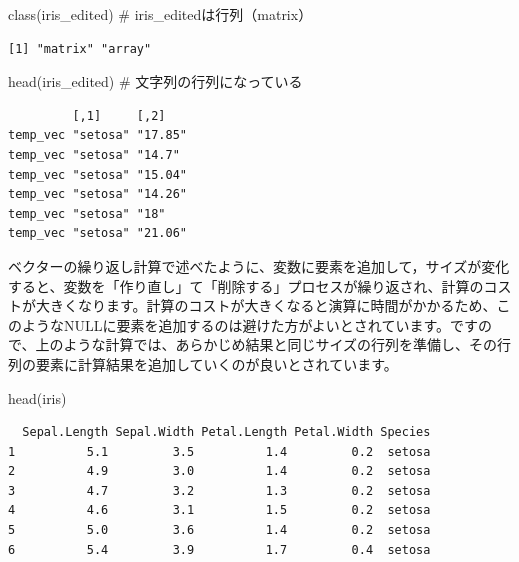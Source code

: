 \documentclass[
  letterpaper,
  DIV=11,
  numbers=noendperiod]{scrreprt}
\newenvironment{Shaded}{\begin{snugshade}}{\end{snugshade}}
\newcommand{\CommentTok}[1]{\textcolor[rgb]{0.37,0.37,0.37}{#1}}
\newcommand{\FunctionTok}[1]{\textcolor[rgb]{0.28,0.35,0.67}{#1}}
\newcommand{\NormalTok}[1]{\textcolor[rgb]{0.00,0.23,0.31}{#1}}
\begin{document}
\begin{Shaded}
\begin{Highlighting}[]
\FunctionTok{class}\NormalTok{(iris\_edited) }\CommentTok{\# iris\_editedは行列（matrix）}
\end{Highlighting}
\end{Shaded}

\begin{verbatim}
[1] "matrix" "array" 
\end{verbatim}

\begin{Shaded}
\begin{Highlighting}[]
\FunctionTok{head}\NormalTok{(iris\_edited) }\CommentTok{\# 文字列の行列になっている}
\end{Highlighting}
\end{Shaded}

\begin{verbatim}
         [,1]     [,2]   
temp_vec "setosa" "17.85"
temp_vec "setosa" "14.7" 
temp_vec "setosa" "15.04"
temp_vec "setosa" "14.26"
temp_vec "setosa" "18"   
temp_vec "setosa" "21.06"
\end{verbatim}

ベクターの繰り返し計算で述べたように、変数に要素を追加して，サイズが変化すると、変数を「作り直し」て「削除する」プロセスが繰り返され、計算のコストが大きくなります。計算のコストが大きくなると演算に時間がかかるため、このようなNULLに要素を追加するのは避けた方がよいとされています。ですので、上のような計算では、あらかじめ結果と同じサイズの行列を準備し、その行列の要素に計算結果を追加していくのが良いとされています。

\begin{Shaded}
\begin{Highlighting}[]
\FunctionTok{head}\NormalTok{(iris)}
\end{Highlighting}
\end{Shaded}

\begin{verbatim}
  Sepal.Length Sepal.Width Petal.Length Petal.Width Species
1          5.1         3.5          1.4         0.2  setosa
2          4.9         3.0          1.4         0.2  setosa
3          4.7         3.2          1.3         0.2  setosa
4          4.6         3.1          1.5         0.2  setosa
5          5.0         3.6          1.4         0.2  setosa
6          5.4         3.9          1.7         0.4  setosa
\end{verbatim}
\end{document}
